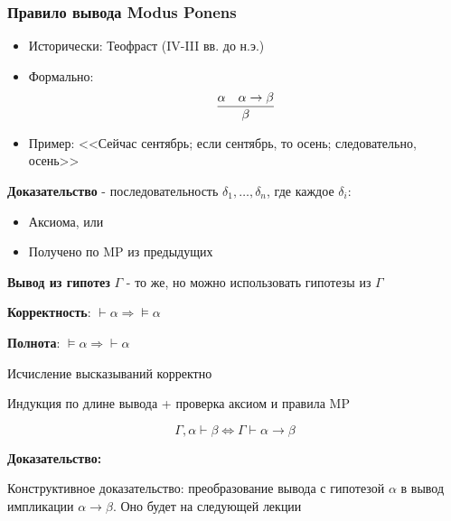 \subsubsection{Правило вывода Modus Ponens}

\begin{itemize}
\item Исторически: Теофраст (IV-III вв. до н.э.)
\item Формально: $$\infer{\beta}{\alpha & \alpha\rightarrow\beta}$$
\item Пример: <<Сейчас сентябрь; если сентябрь, то осень; следовательно, осень>>
\end{itemize}

\begin{defrus}
\textbf{Доказательство} - последовательность $\delta_1, \dots, \delta_n$, где каждое $\delta_i$:
\begin{itemize}
\item Аксиома, или
\item Получено по MP из предыдущих
\end{itemize}
\end{defrus}
\begin{defrus}
\textbf{Вывод из гипотез} $\Gamma$ - то же, но можно использовать гипотезы из $\Gamma$
\end{defrus}


\begin{defrus}
 \textbf{Корректность}: $\vdash\alpha \Rightarrow \models\alpha$
 \end{defrus}
 \begin{defrus}
 \textbf{Полнота}: $\models\alpha \Rightarrow \vdash\alpha$
\end{defrus}

\begin{thmrus}
Исчисление высказываний корректно
\end{thmrus}



Индукция по длине вывода + проверка аксиом и правила MP


\begin{thmrus}[о дедукции]
$$\Gamma,\alpha\vdash\beta \Leftrightarrow \Gamma\vdash\alpha\rightarrow\beta$$
\end{thmrus}

\textbf{Доказательство:}

Конструктивное доказательство: преобразование вывода с гипотезой $\alpha$ в вывод импликации $\alpha\rightarrow\beta$. Оно будет на следующей лекции

